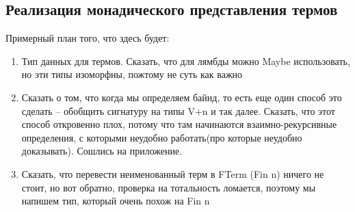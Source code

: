 \subsection{Реализация монадического представления термов}

Примерный план того, что здесь будет:
\begin{enumerate}
  \item Тип данных для термов. Сказать, что для лямбды можно Maybe использовать, но эти типы изоморфны, пожтому не суть как важно
  \item Сказать о том, что когда мы определяем байнд, то есть еще один способ это сделать -- обобщить сигнатуру на типы V+n и так далее. Сказать, что этот способ откровенно плох, потому что там начинаются взаимно-рекурсивные определения, с которыми неудобно работать(про которые неудобно доказывать). Сошлись на приложение.
  \item Сказать, что перевести неименованный терм в FTerm (Fin n) ничего не стоит, но вот обратно, проверка на тотальность ломается, поэтому мы напишем тип, который очень похож на Fin n
\end{enumerate}
